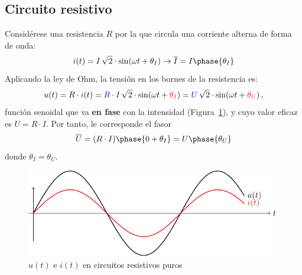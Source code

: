 \documentclass[11pt]{book} %
\begin{document}
	\subsection{Circuito resistivo}\label{sec.R-puro}
	
	Considérese una resistencia $R$ por la que circula una corriente alterna de forma de onda:
	\begin{equation*}
		i(t)=I\,\sqrt{2}\cdot\sin(\omega t+\theta_I)\rightarrow\overline{I}=I\phase{\theta_I}
	\end{equation*}
	Aplicando la ley de Ohm, la tensión en los bornes de la resistencia es:
	\begin{equation*}
		u(t)=R\cdot i(t) ={\color{blue}R\cdot I}\,\sqrt{2}\cdot\sin(\omega t+{\color{red}\theta_I})={\color{blue}U}\,\sqrt{2}\cdot\sin(\omega t+{\color{red}\theta_U})\,,
	\end{equation*}
	función senoidal que va \textbf{en fase} con la intensidad (Figura~\ref{fig.resistivo}), y cuyo valor eficaz es $U=R\cdot I$. Por tanto, le corresponde el fasor
	\begin{equation*}
		\overline{U}=(R\cdot I)\phase{0+\theta_I}=U\phase{\theta_U}
	\end{equation*}
	donde $\theta_I=\theta_U$.
	\begin{figure}[htbp]
		\centering
		\includegraphics{../figs/resistivo.pdf}
		\caption{$u(t)$ e $i(t)$ en circuitos resistivos puros}
		\label{fig.resistivo}
	\end{figure}
	
\end{document}
